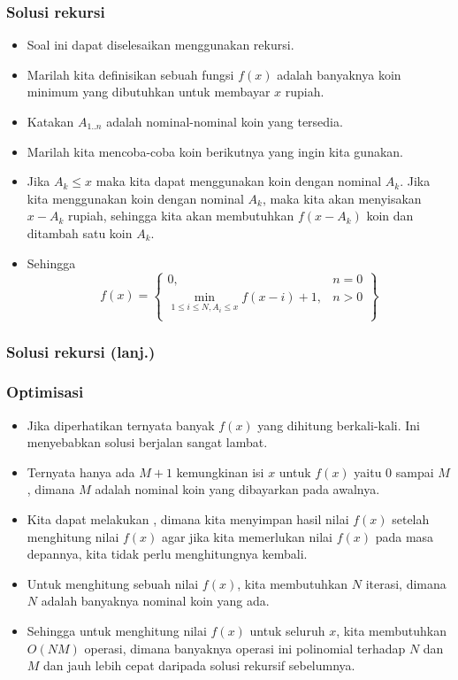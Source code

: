\begin{frame}
\frametitle{Solusi rekursi}
\begin{itemize}
  \item Soal ini dapat diselesaikan menggunakan rekursi.
  \item Marilah kita definisikan sebuah fungsi $f(x)$ adalah banyaknya koin minimum yang dibutuhkan untuk membayar $x$ rupiah.
  \item Katakan $A_{1..n}$ adalah nominal-nominal koin yang tersedia.
  \item Marilah kita mencoba-coba koin berikutnya yang ingin kita gunakan.
  \item Jika $A_k \leq x$ maka kita dapat menggunakan koin dengan nominal $A_k$. Jika kita menggunakan koin dengan nominal $A_k$, maka kita akan menyisakan $x - A_k$ rupiah, sehingga kita akan membutuhkan $f(x-A_k)$ koin dan ditambah satu koin $A_k$.
   \item Sehingga 
   \[f(x) = \left\{\begin{array}{lr}
        0, & n = 0\\
        \min_{1 \leq i \leq N, A_i \leq x} {f(x - i) + 1}, & n > 0\\
        \end{array}\right\}\]
 \end{itemize}
\end{frame}

\begin{frame}
\frametitle{Solusi rekursi (lanj.)}
\end{frame}

\begin{frame}
\frametitle{Optimisasi}
\begin{itemize}
  \item Jika diperhatikan ternyata banyak $f(x)$ yang dihitung berkali-kali. Ini menyebabkan solusi berjalan sangat lambat.
  \item Ternyata hanya ada $M + 1$ kemungkinan isi $x$ untuk $f(x)$ yaitu $0$ sampai $M$, dimana $M$ adalah nominal koin yang dibayarkan pada awalnya.
  \item Kita dapat melakukan , dimana kita menyimpan hasil nilai $f(x)$ setelah menghitung nilai $f(x)$ agar jika kita memerlukan nilai $f(x)$ pada masa depannya, kita tidak perlu menghitungnya kembali.
  \item Untuk menghitung sebuah nilai $f(x)$, kita membutuhkan $N$ iterasi, dimana $N$ adalah banyaknya nominal koin yang ada.
  \item Sehingga untuk menghitung nilai $f(x)$ untuk seluruh $x$, kita membutuhkan $O(NM)$ operasi, dimana banyaknya operasi ini polinomial terhadap $N$ dan $M$ dan jauh lebih cepat daripada solusi rekursif sebelumnya.
\end{itemize}
\end{frame}

